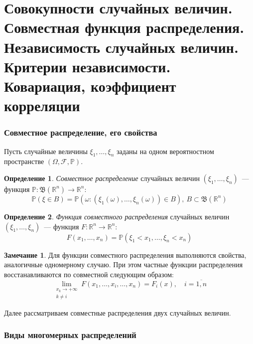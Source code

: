 \documentclass[oneside,final,14pt]{extreport}
\theoremstyle{plain}
\theoremstyle{definition}
\newtheorem*{defn}{Определение}
\newtheorem*{rmrk}{Замечание}
\theoremstyle{named}
\begin{document}
\section{Совокупности случайных величин. Совместная функция распределения. Независимость случайных величин. Критерии независимости. Ковариация, коэффициент корреляции}

\subsubsection{Совместное распределение, его свойства}

Пусть случайные величины $\xi_1, \ldots, \xi_n$ заданы на одном вероятностном пространстве $(\Omega, \mathcal{F}, \mathbb{P})$.
\begin{defn}
    {\it Совместное распределение} случайных величин $(\xi_1, \ldots, \xi_n)$~--- функция $\mathbb{P}: \mathfrak{B}(\mathbb{R}^{n}) \to \mathbb{R}^{n}$:
    \begin{equation*}
        \mathbb{P}(\xi \in B) = \mathbb{P}(\omega \colon (\xi_{1}(\omega), \ldots, \xi_{n}(\omega)) \in B),~ B \subset \mathfrak{B}(\mathbb{R}^{n})
    \end{equation*}
\end{defn}
\begin{defn}
    {\it Функция совместного распределения} случайных величин $(\xi_1, \ldots, \xi_n)$~--- функция $F: \mathbb{R}^{n} \to \mathbb{R}^{n}$:
    \begin{equation*}
        F(x_{1}, \ldots, x_{n})=\mathbb{P}(\xi_{1}<x_{1}, \ldots, \xi_{n}<x_{n})
    \end{equation*}
\end{defn}

\begin{rmrk}
    Для функции совместного распределения выполняются свойства, аналогичные одномерному случаю. При этом частные функции распределения восстанавливаются по совместной следующим образом:
    \begin{equation*}
        \lim_{\substack{x_{k} \to +\infty \\ k \neq i}}  F(x_{1}, \ldots, x_{i}, \ldots, x_{n}) = F_{i}(x), \quad i = \overline{1,n}
    \end{equation*}
\end{rmrk}
Далее рассматриваем совместные распределения двух случайных величин.

\subsubsection{Виды многомерных распределений}
\end{document}
